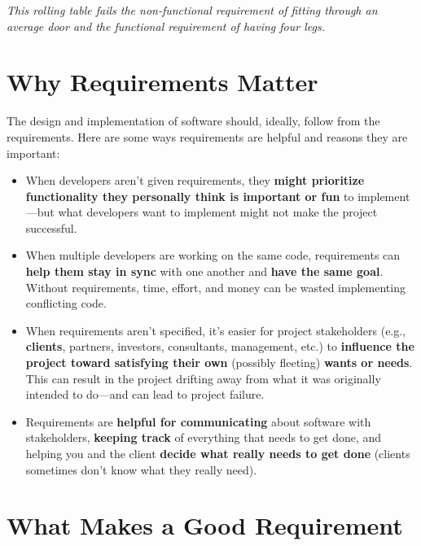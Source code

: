 \textit{This rolling table fails the non-functional requirement of fitting through an average door and the functional requirement of having four legs.}

\section{Why Requirements Matter}

The design and implementation of software should, ideally, follow from the requirements. Here are some ways requirements are helpful and reasons they are important:

\begin{itemize}
\item When developers aren't given requirements, they \textbf{might prioritize functionality they personally think is important or fun} to implement---but what developers want to implement might not make the project successful.
\item When multiple developers are working on the same code, requirements can \textbf{help them stay in sync} with one another and \textbf{have the same goal}. Without requirements, time, effort, and money can be wasted implementing conflicting code.
\item When requirements aren't specified, it's easier for project stakeholders (e.g., \textbf{clients}, partners, investors, consultants, management, etc.) to \textbf{influence the project toward satisfying their own} (possibly fleeting) \textbf{wants or needs}. This can result in the project drifting away from what it was originally intended to do---and can lead to project failure.
\item Requirements are \textbf{helpful for communicating} about software with stakeholders, \textbf{keeping track} of everything that needs to get done, and helping you and the client \textbf{decide what really needs to get done} (clients sometimes don't know what they really need).
\end{itemize}\marginpar{\clientDef}

\section{What Makes a Good Requirement}

